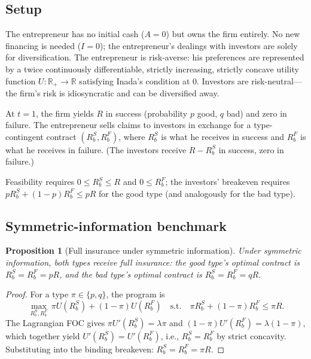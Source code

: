 \documentclass[11pt,a4paper,oneside]{book}
\def\R{\mathbb{R}}
\def\leq{\leqslant}
\theoremstyle{plain}
\newtheorem{proposition}[theorem]{Proposition}
\theoremstyle{definition}
\theoremstyle{remark}
\numberwithin{equation}{chapter}
\begin{document}
\subsection{Setup}

The entrepreneur has no initial cash ($A = 0$) but owns the firm entirely.
No new financing is needed ($I = 0$); the entrepreneur's dealings with investors are solely for diversification.
The entrepreneur is risk-averse: his preferences are represented by a twice continuously differentiable, strictly increasing, strictly concave utility function $U: \R_+ \to \R$ satisfying Inada's condition at $0$.
Investors are risk-neutral---the firm's risk is idiosyncratic and can be diversified away.

At $t = 1$, the firm yields $R$ in success (probability $p$ good, $q$ bad) and zero in failure.
The entrepreneur sells claims to investors in exchange for a type-contingent contract $(R_b^S, R_b^F)$, where $R_b^S$ is what he receives in success and $R_b^F$ is what he receives in failure.
(The investors receive $R - R_b^S$ in success, zero in failure.)

Feasibility requires $0 \leq R_b^S \leq R$ and $0 \leq R_b^F$; the investors' breakeven requires $p R_b^S + (1 - p) R_b^F \leq pR$ for the good type (and analogously for the bad type).

\subsection{Symmetric-information benchmark}

\begin{proposition}[Full insurance under symmetric information]\label{prop:diss-divers-sym}
Under symmetric information, both types receive full insurance: the good type's optimal contract is $R_b^S = R_b^F = pR$, and the bad type's optimal contract is $R_b^S = R_b^F = qR$.
\end{proposition}

\begin{proof}
For a type $\pi \in \{p, q\}$, the program is
\begin{equation*}
  \max_{R_b^S, R_b^F} \, \pi U(R_b^S) + (1 - \pi) U(R_b^F)
  \quad\text{s.t.}\quad
  \pi R_b^S + (1 - \pi) R_b^F \leq \pi R.
\end{equation*}
The Lagrangian FOC gives $\pi U'(R_b^S) = \lambda \pi$ and $(1 - \pi) U'(R_b^F) = \lambda (1 - \pi)$, which together yield $U'(R_b^S) = U'(R_b^F)$, i.e., $R_b^S = R_b^F$ by strict concavity.
Substituting into the binding breakeven: $R_b^S = R_b^F = \pi R$.
\end{proof}
\end{document}
